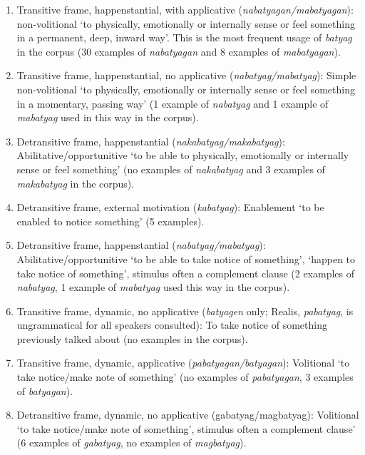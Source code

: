 \ea
\label{ex:meaningsofbatyag}
\begin{enumerate}
\item Transitive frame, happenstantial, with applicative (\textit{nabatyagan/mabatyagan}): non-volitional ‘to physically, emotionally or internally sense or feel something in a permanent, deep, inward way’. This is the most frequent usage of \textit{batyag} in the corpus (30 examples of \textit{nabatyagan} and 8 examples of \textit{mabatyagan}). %
\item Transitive frame, happenstantial, no applicative (\textit{nabatyag/mabatyag}): Simple non-volitional ‘to physically, emotionally or internally sense or feel something in a momentary, passing way’ (1 example of \textit{nabatyag} and 1 example of \textit{mabatyag} used in this way in the corpus). %
\item Detransitive frame, happenstantial (\textit{nakabatyag/makabatyag}): Abilitative/opportunitive ‘to be able to physically, emotionally or internally sense or feel something’ (no examples of \textit{nakabatyag} and 3 examples of \textit{makabatyag} in the corpus). %
\item Detransitive frame, external motivation (\textit{kabatyag}): Enablement ‘to be enabled to notice something’ (5 examples). %
\item Detransitive frame, happenstantial (\textit{nabatyag/mabatyag}): Abilitative/opportunitive ‘to be able to take notice of something’, ‘happen to take notice of something’, stimulus often a complement clause (2 examples of \textit{nabatyag}, 1 example of \textit{mabatyag} used this way in the corpus). %
\item Transitive frame, dynamic, no applicative (\textit{batyagen} only; Realis, \textit{pabatyag}, is ungrammatical for all speakers consulted): To take notice of something previously talked about (no examples in the corpus). %
\item Transitive frame, dynamic, applicative (\textit{pabatyagan/batyagan}): Volitional ‘to take notice/make note of something’ (no examples of \textit{pabatyagan}, 3 examples of \textit{batyagan}). %
\item Detransitive frame, dynamic, no applicative (gabatyag/magbatyag): Volitional ‘to take notice/make note of something’, stimulus often a complement clause’ (6 examples of \textit{gabatyag}, no examples of \textit{magbatyag}). %
\end{enumerate}
\z

